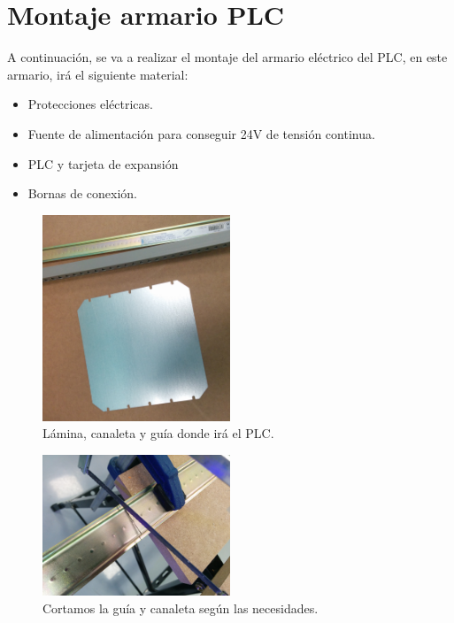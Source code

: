 \section{Montaje armario PLC}
A continuación, se va a realizar el montaje del armario eléctrico del PLC, en este armario, irá el siguiente material:

    \begin{itemize}
        \item{Protecciones eléctricas.}
        \item{Fuente de alimentación para conseguir 24V de tensión continua.}
        \item{PLC y tarjeta de expansión}
        \item{Bornas de conexión.}
    \end{itemize}

    \begin{figure}[H]
            \centering
            \includegraphics[width=0.5\textwidth]{images/cuadro/IMG_20150311_162414.jpg}
            \caption{Lámina, canaleta y guía donde irá el PLC.}
            \label{fig:cuad_montaje1}
    \end{figure}
    \begin{figure}[H]
            \centering
            \includegraphics[width=0.5\textwidth]{images/cuadro/IMG_20150311_164348.jpg}
            \caption{Cortamos la guía y canaleta según las necesidades.}
            \label{fig:cuad_montaje2}
    \end{figure}
